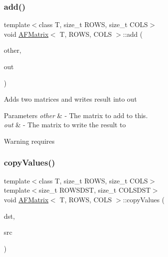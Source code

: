 \subsubsection{\texorpdfstring{add()}{add()}}
{\footnotesize\ttfamily template$<$class T, size\+\_\+t R\+O\+WS, size\+\_\+t C\+O\+LS$>$ \\
void \hyperlink{class_a_f_matrix}{A\+F\+Matrix}$<$ T, R\+O\+WS, C\+O\+LS $>$\+::add (\begin{DoxyParamCaption}\item[{\hyperlink{class_a_f_matrix}{A\+F\+Matrix}$<$ T, R\+O\+WS, C\+O\+LS $>$ $\ast$}]{other,  }\item[{\hyperlink{class_a_f_matrix}{A\+F\+Matrix}$<$ T, R\+O\+WS, C\+O\+LS $>$ $\ast$}]{out }\end{DoxyParamCaption})\hspace{0.3cm}{\ttfamily [inline]}}

Adds two matrices and writes result into {\ttfamily out} 
\begin{DoxyParams}{Parameters}
{\em other} & -\/ The matrix to add to {\ttfamily this}. \\
\hline
{\em out} & -\/ The matrix to write the result to \\
\hline
\end{DoxyParams}
\begin{DoxyWarning}{Warning}
requires 
\end{DoxyWarning}
\mbox{\label{class_a_f_matrix_a599d98652f79f6762b812ec0a4fd7216}} 
\subsubsection{\texorpdfstring{copy\+Values()}{copyValues()}\hspace{0.1cm}{\footnotesize\ttfamily [1/4]}}
{\footnotesize\ttfamily template$<$class T, size\+\_\+t R\+O\+WS, size\+\_\+t C\+O\+LS$>$ \\
template$<$size\+\_\+t R\+O\+W\+S\+D\+ST, size\+\_\+t C\+O\+L\+S\+D\+ST$>$ \\
void \hyperlink{class_a_f_matrix}{A\+F\+Matrix}$<$ T, R\+O\+WS, C\+O\+LS $>$\+::copy\+Values (\begin{DoxyParamCaption}\item[{\hyperlink{class_a_f_matrix}{A\+F\+Matrix}$<$ T, R\+O\+W\+S\+D\+ST, C\+O\+L\+S\+D\+ST $>$ $\ast$}]{dst,  }\item[{\hyperlink{class_a_f_matrix}{A\+F\+Matrix}$<$ T, R\+O\+WS, C\+O\+LS $>$ $\ast$}]{src }\end{DoxyParamCaption})\hspace{0.3cm}{\ttfamily [inline]}}


